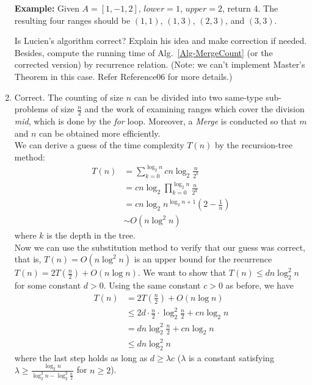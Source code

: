 \documentclass[12pt,a4paper]{article}
\makeatletter
\newtheorem*{solution}{Solution}
\theoremstyle{definition}
\renewenvironment{solution}[1][Solution] {\par\pushQED{\qed}\normalfont\topsep6\p@\@plus6\p@\relax\trivlist\item[\hskip\labelsep\bfseries#1\@addpunct{.}]\ignorespaces}{\popQED\endtrivlist\@endpefalse} \makeatother
\makeatother
\begin{document}
\begin{enumerate}
\begin{minipage}[t]{0.90\textwidth}
\begin{algorithm}[H]
	\end{algorithm}
\end{minipage}

    {\color{purple}\textbf{Example:} Given $A = [1,-1,2]$, $lower = 1$, $upper = 2$, return 4. The resulting four ranges should be $(1,1)$, $(1,3)$, $(2,3)$, and $(3,3)$.}

    Is Lucien's algorithm correct? Explain his idea and make correction if needed. Besides, compute the running time of Alg.~\ref{Alg-MergeCount} (or the corrected version) by recurrence relation. {\color{blue}(Note: we can't implement Master's Theorem in this case. Refer Reference06 for more details.)}
	\begin{solution}
		\hfill \break
		Correct. The counting of size $n$ can be divided into two same-type sub-problems of size $\frac{n}{2}$ and the work of examining ranges which cover the division \emph{mid}, which is done by the \emph{for} loop. Moreover, a \emph{Merge} is conducted so that $m$ and $n$ can be obtained more efficiently. \\
		We can derive a guess of the time complexity $T(n)$ by the recursion-tree method: 
		\begin{align*}
			T(n) & = \sum\limits_{k=0}^{\log_{2} n} cn \log_{2} \frac{n}{2^k} \\
			& = cn \log_{2} \prod_{k=0}^{\log_{2} n} \frac{n}{2^k} \\
			& = cn \log_{2} n^{\log_{2} n + 1} (2 - \frac{1}{n}) \\
			& \sim O(n \log^2 n)
		\end{align*}
		where $k$ is the depth in the tree. \\
		Now we can use the substitution method to verify that our guess was correct, that is, $T(n) = O(n \log^2 n)$ is an upper bound for the recurrence $T(n) = 2T(\frac{n}{2}) + O(n \log n)$. We want to show that $T(n) \leq dn \log_{2}^2 n$ for some constant $d>0$. Using the same constant $c>0$ as before, we have \\
		\begin{align*}
			T(n) & = 2T(\frac{n}{2}) + O(n \log n) \\
			& \leq 2d \cdot \frac{n}{2} \cdot \log_{2}^2 \frac{n}{2} + cn \log_{2} n \\
			& = dn\log_{2}^2 \frac{n}{2} + cn \log_{2} n \\
			& \leq dn\log_{2}^2 n
		\end{align*}
		where the last step holds as long as $d \geq \lambda c$ ($\lambda$ is a constant satisfying $\lambda \geq \frac{\log_{2} n}{\log_{2}^2 n - \log_{2}^2 \frac{n}{2}}$ for $n \geq 2$). 

\end{solution}
\end{enumerate}
\end{document}
